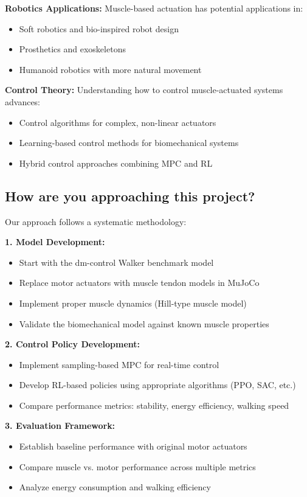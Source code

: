 \documentclass{article}
\begin{document}
\textbf{Robotics Applications:} Muscle-based actuation has potential applications in:
\begin{itemize}
    \item Soft robotics and bio-inspired robot design
    \item Prosthetics and exoskeletons
    \item Humanoid robotics with more natural movement
\end{itemize}

\textbf{Control Theory:} Understanding how to control muscle-actuated systems advances:
\begin{itemize}
    \item Control algorithms for complex, non-linear actuators
    \item Learning-based control methods for biomechanical systems
    \item Hybrid control approaches combining MPC and RL
\end{itemize}

\subsection{How are you approaching this project?}

Our approach follows a systematic methodology:

\textbf{1. Model Development:}
\begin{itemize}
    \item Start with the dm-control Walker benchmark model
    \item Replace motor actuators with muscle tendon models in MuJoCo
    \item Implement proper muscle dynamics (Hill-type muscle model)
    \item Validate the biomechanical model against known muscle properties
\end{itemize}

\textbf{2. Control Policy Development:}
\begin{itemize}
    \item Implement sampling-based MPC for real-time control
    \item Develop RL-based policies using appropriate algorithms (PPO, SAC, etc.)
    \item Compare performance metrics: stability, energy efficiency, walking speed
\end{itemize}

\textbf{3. Evaluation Framework:}
\begin{itemize}
    \item Establish baseline performance with original motor actuators
    \item Compare muscle vs. motor performance across multiple metrics
    \item Analyze energy consumption and walking efficiency
\end{itemize}
\end{document}

